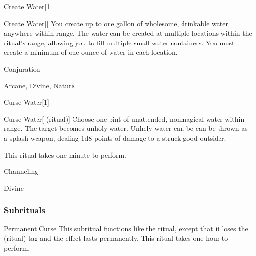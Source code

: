 \begin{spellsection}{Create Water}[1]


\begin{ability}{Create Water}[]
You create up to one gallon of wholesome, drinkable water anywhere within \rngclose range.
The water can be created at multiple locations within the ritual's range, allowing you to fill multiple small water containers.
You must create a minimum of one ounce of water in each location.
\end{ability}




 Conjuration

 Arcane, Divine, Nature
\end{spellsection}


\begin{spellsection}{Curse Water}[1]


\begin{ability}{Curse Water}[ (ritual)]
Choose one pint of unattended, nonmagical water within \rngclose range.
The target becomes unholy water.
Unholy water can be can be thrown as a splash weapon, dealing 1d8 points of damage to a struck good outsider.

This ritual takes one minute to perform.
\end{ability}




 Channeling

 Divine
\end{spellsection}


\subsubsection{Subrituals}


\begin{ability}[\nth{2}]{Permanent Curse}
This subritual functions like the  ritual, except that it loses the  (ritual) tag and the effect lasts permanently.
This ritual takes one hour to perform.
\end{ability}
\vspace{0.25em}


